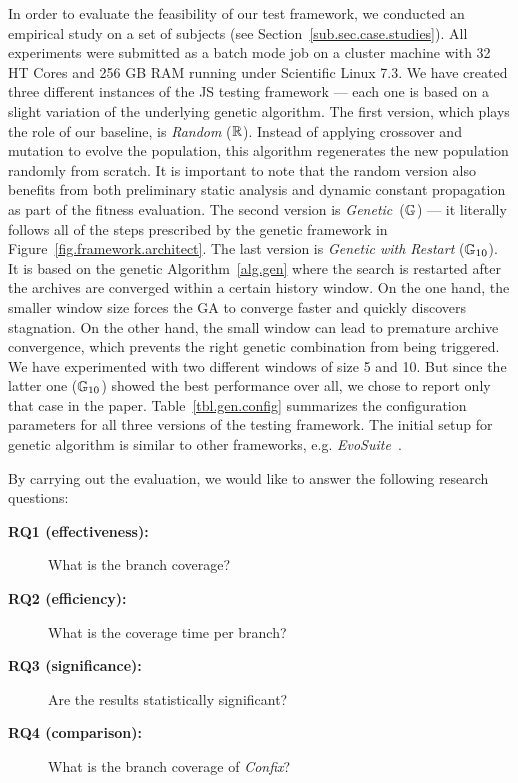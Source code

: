 In order to evaluate the feasibility of our test framework, we conducted an empirical study on a set of subjects (see Section~\ref{sub.sec.case.studies}). All experiments were submitted as a batch mode job on a cluster machine with 32 HT Cores and 256 GB RAM running under Scientific Linux 7.3. We have created three different instances of the JS testing framework --- each one is based on a slight variation of the underlying genetic algorithm. The first version, which plays the role of our baseline, is \emph{Random} ($\mathbb{R}$). Instead of applying crossover and mutation to evolve the population, this algorithm regenerates the new population randomly from scratch. It is important to note  that the random version also benefits from both preliminary static analysis and dynamic constant propagation as part of the fitness evaluation. The second version is \emph{Genetic}~($\mathbb{G}$) --- it literally follows all of the steps prescribed by the genetic framework in Figure~\ref{fig.framework.architect}. The last version is \emph{Genetic with Restart} ($\mathbb{G}_{10}$). It is based on the genetic Algorithm~\ref{alg.gen} where the search is restarted after the archives are converged within a certain history window. On the one hand, the smaller window size forces the GA to converge faster and quickly discovers stagnation. On the other hand, the small window can lead to premature archive convergence, which prevents the right genetic combination from being triggered. We have experimented with two different windows of size 5 and 10. But since the latter one ($\mathbb{G}_{10}$) showed the best performance over all, we chose to report only that case in the paper. Table~\ref{tbl.gen.config} summarizes the configuration parameters for all three versions of the testing framework. The initial setup for genetic algorithm is similar to other frameworks, e.g. \emph{EvoSuite}~\cite{fraser2011evosuite}.

By carrying out the evaluation, we would like to answer the following research questions:
\begin{description}
\item[\textbf{RQ1 (effectiveness):}] What is the branch coverage?
\item[\textbf{RQ2 (efficiency):}] What is the coverage time per branch?
\item[\textbf{RQ3 (significance):}] Are the results statistically significant?
\item[\textbf{RQ4 (comparison):}] What is the branch coverage of \emph{Confix}?
\end{description}


